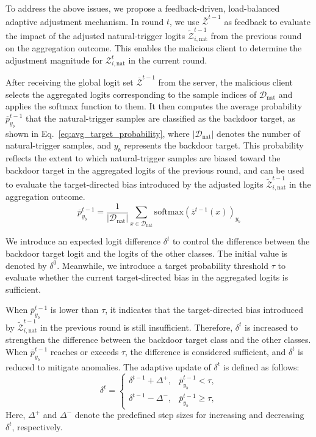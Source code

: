 \documentclass[lettersize,journal]{IEEEtran}
\newif\ifhighlight
\newcommand{\hlone}[1]{%
    \ifhighlight{\color{reviewer1}#1}\else#1\fi
}
\begin{document}
To address the above issues, we propose a feedback-driven, load-balanced adaptive adjustment mechanism. 
In round \(t\), we use \(\overline{\mathcal{Z}}^{t-1}\) as feedback to evaluate the impact of the adjusted natural-trigger logits \(\widetilde{\mathcal{Z}}_{i,\mathrm{nat}}^{t-1}\) from the previous round on the aggregation outcome. This enables the malicious client to determine the adjustment magnitude for \(\mathcal{Z}_{i,\mathrm{nat}}^t\) in the current round.

After receiving the global logit set $\overline{\mathcal{Z}}^{t-1}$ from the server, the malicious client selects the aggregated logits corresponding to the sample indices of \(\mathcal{D}_\mathrm{nat}\) and applies the softmax function to them.
It then computes the average probability \(\overline{p}^{t-1}_{y_b}\) that the natural-trigger samples are classified as the backdoor target, as shown in Eq.~\ref{eq:avg_target_probability}, where $|\mathcal{D}_\mathrm{nat}|$ denotes the number of natural-trigger samples, and $y_b$ represents the backdoor target.
This probability reflects the extent to which natural-trigger samples are biased toward the backdoor target in the aggregated logits of the previous round, and can be used to evaluate the target-directed bias introduced by the adjusted logits \(\widetilde{\mathcal{Z}}_{i,\mathrm{nat}}^{t-1}\) in the aggregation outcome.
\begin{equation}
\overline{p}^{t-1}_{y_b}
=
\frac{1}{|\mathcal{D}_\mathrm{nat}|}
\sum_{x\in\mathcal{D}_\mathrm{nat}}
\mathrm{softmax}\left(\overline{z}^{t-1}(x)\right)_{y_b}
\label{eq:avg_target_probability}
\end{equation}

We introduce an expected logit difference \(\delta^t\) to control the difference between the backdoor target logit and the logits of the other classes.
The initial value is denoted by \(\delta^0\). Meanwhile, we introduce a target probability threshold \(\tau\) to evaluate whether the current target-directed bias in the aggregated logits is sufficient.

When \(\overline{p}^{t-1}_{y_b}\) is lower than \(\tau\), it indicates that the target-directed bias introduced by \(\widetilde{\mathcal{Z}}_{i,\mathrm{nat}}^{t-1}\) in the previous round is still insufficient.
Therefore, \(\delta^t\) is increased to strengthen the difference between the backdoor target class and the other classes.
When \(\overline{p}^{t-1}_{y_b}\) reaches or exceeds \(\tau\), the difference is considered sufficient, and \(\delta^t\) is reduced to mitigate anomalies. The adaptive update of \(\delta^t\) is defined as follows:
\begin{equation}
\delta^t=
\begin{cases}
\delta^{t-1}+\Delta^+, & \overline{p}^{t-1}_{y_b}<\tau,\\
\delta^{t-1}-\Delta^-, & \overline{p}^{t-1}_{y_b}\geq\tau,
\end{cases}
\label{eq:adaptive_delta_update}
\end{equation}
\hlone{Here, $\Delta^+$ and $\Delta^-$ denote the predefined step sizes for increasing and decreasing $\delta^t$, respectively.}
\end{document}
